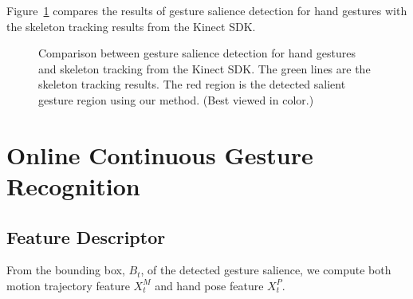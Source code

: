 \documentclass{sigchi}
\begin{document}
Figure~\ref{fig:compare-skeleton} compares the results of gesture salience detection for hand gestures with the skeleton tracking results
from the Kinect SDK.
\begin{figure}
\centering
{}
\caption{Comparison between gesture salience detection for hand gestures and skeleton tracking from the Kinect SDK. The green lines are
the skeleton tracking results. The red region is the detected salient gesture
region using our method. (Best viewed in color.)}
\label{fig:compare-skeleton}
\end{figure}

\section{Online Continuous Gesture Recognition}
\subsection{Feature Descriptor}
From the bounding box, $B_t$, of the detected gesture salience, we compute both
motion trajectory feature $X_t^M$ and hand pose feature $X_t^P$. 
\end{document}
